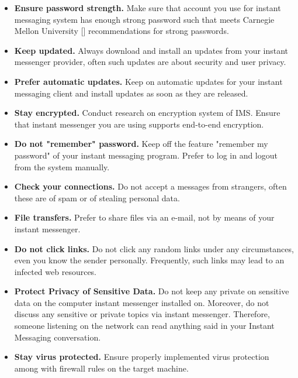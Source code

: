 \begin{itemize}
    \item \textbf{Ensure password strength.} Make sure that account you use for instant messaging system has enough
    strong password such that meets Carnegie Mellon University [\cite{shay2010encountering}] recommendations
    for strong passwords.
    \item \textbf{Keep updated.} Always download and install an updates from your instant messenger provider,
    often such updates are about security and user privacy.
    \item \textbf{Prefer automatic updates.} Keep on automatic updates for your instant messaging client and install
    updates as soon as they are released.
    \item \textbf{Stay encrypted.} Conduct research on encryption system of IMS\@.
    Ensure that instant messenger you are using supports end-to-end encryption.
    \item \textbf{Do not "remember" password.} Keep off the feature "remember my password" of your
    instant messaging program.
    Prefer to log in and logout from the system manually.
    \item \textbf{Check your connections.} Do not accept a messages from strangers, often these are of spam or of stealing
    personal data.
    \item \textbf{File transfers.} Prefer to share files via an e-mail, not by means of your instant messenger.
    \item \textbf{Do not click links.} Do not click any random links under any circumstances, even you know the sender
    personally.
    Frequently, such links may lead to an infected web resources.
    \item \textbf{Protect Privacy of Sensitive Data.}
    Do not keep any private on sensitive data on the computer instant messenger installed on.
    Moreover, do not discuss any sensitive or private topics via instant messenger.
    Therefore, someone listening on the network can read anything said in your Instant Messaging conversation.
    \item \textbf{Stay virus protected.} Ensure properly implemented virus protection among with firewall rules
    on the target machine.
\end{itemize}

